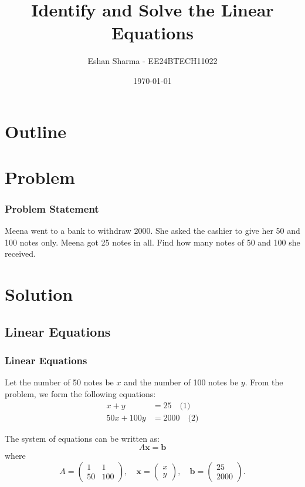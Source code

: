 \documentclass{beamer}
\title{Identify and Solve the Linear Equations}
\author{Eshan Sharma - EE24BTECH11022}
\date{\today}
\theoremstyle{remark}
\numberwithin{equation}{section}
\begin{document}
	
	\begin{frame}
		\titlepage
	\end{frame}
	
	\section*{Outline}
	\begin{frame}
		\tableofcontents
	\end{frame}
	
	\section{Problem}
	\begin{frame}
		\frametitle{Problem Statement}
		Meena went to a bank to withdraw 2000. She asked the cashier to give her 50 and 100 notes only. Meena got 25 notes in all. Find how many notes of 50 and 100 she received.
	\end{frame}
	
	\section{Solution}
	
	\subsection{Linear Equations}
	\begin{frame}
		\frametitle{Linear Equations}
		Let the number of 50 notes be \(x\) and the number of 100 notes be \(y\). From the problem, we form the following equations:
		\begin{align}
			x + y &= 25 \quad \text{(1)} \\
			50x + 100y &= 2000 \quad \text{(2)}
		\end{align}
		
		The system of equations can be written as:
		\[
		A \mathbf{x} = \mathbf{b}
		\]
		where
		\[
		A = \begin{pmatrix} 1 & 1 \\ 50 & 100 \end{pmatrix}, \quad \mathbf{x} = \begin{pmatrix} x \\ y \end{pmatrix}, \quad \mathbf{b} = \begin{pmatrix} 25 \\ 2000 \end{pmatrix}.
		\]
	\end{frame}
	
\end{document}

